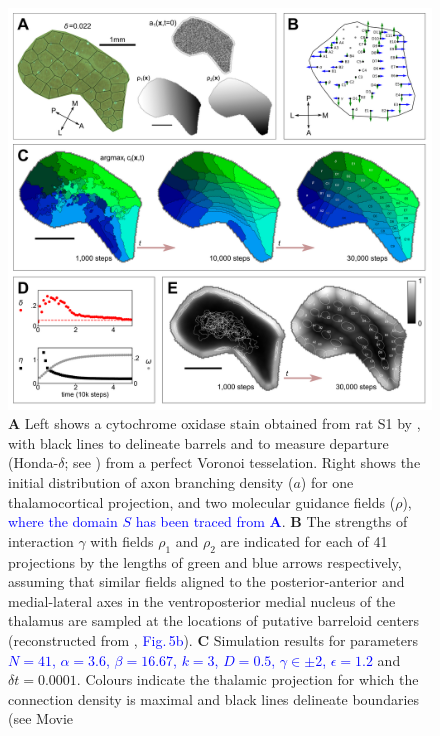 \documentclass[9pt,lineno,draft]{elife}
\newcommand{\cmnt}[1]{\textcolor{blue}{#1}}
\begin{document}
\begin{figure}
  \begin{fullwidth}
    \includegraphics[width=\linewidth]{./Fig1.png}
    \caption{\textbf{A} Left shows a cytochrome oxidase stain obtained from rat S1
      by \cite{zheng_signal_2001}, with black lines to delineate barrels and to
      measure departure (Honda-$\delta$; see \citealp{senft_mouse_1991}) from a
      perfect Voronoi tesselation. Right shows the initial distribution of axon
      branching density ($a$) for one thalamocortical projection, and two
      molecular guidance fields ($\rho$), \cmnt{where the domain $S$ has been
        traced from \textbf{A}}. \textbf{B} The strengths of interaction
      $\gamma$ with fields $\rho_1$ and $\rho_2$ are indicated for each of 41
      projections by the lengths of green and blue arrows respectively, assuming
      that similar fields aligned to the posterior-anterior and medial-lateral
      axes in the ventroposterior medial nucleus of the thalamus are sampled at
      the locations of putative barreloid centers (reconstructed from
      \citealp{haidarliu_size_2001}, \cmnt{Fig.\,5b}). \textbf{C} Simulation results for parameters
      \cmnt{$N=41$, $\alpha=3.6$, $\beta=16.67$, $k=3$, $D=0.5$, $\gamma\in\pm 2$,
      $\epsilon=1.2$} and $\delta{t}=0.0001$. Colours indicate the thalamic
      projection for which the connection density is maximal and black lines
      delineate boundaries (see Movie
}
\end{fullwidth}
\end{figure}
\end{document}
